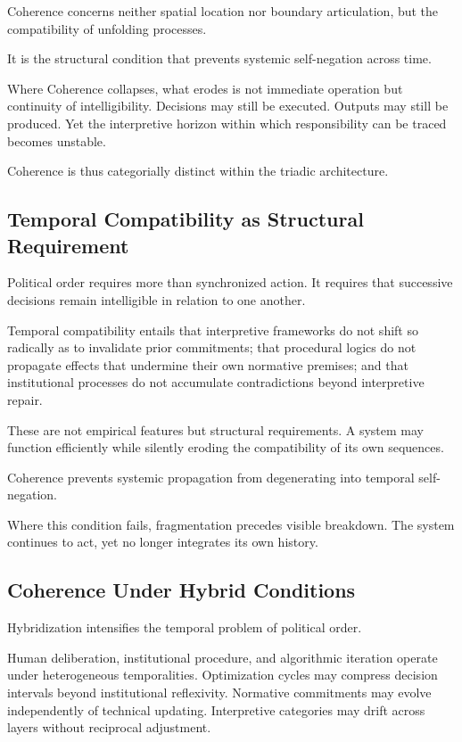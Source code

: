 \documentclass[12pt]{article}
\begin{document}
Coherence concerns neither spatial location nor boundary articulation, but the compatibility of unfolding processes.

It is the structural condition that prevents systemic self-negation across time.

Where Coherence collapses, what erodes is not immediate operation but continuity of intelligibility. Decisions may still be executed. Outputs may still be produced. Yet the interpretive horizon within which responsibility can be traced becomes unstable.

Coherence is thus categorially distinct within the triadic architecture.

\subsection{Temporal Compatibility as Structural Requirement}


Political order requires more than synchronized action. It requires that successive decisions remain intelligible in relation to one another.

Temporal compatibility entails that interpretive frameworks do not shift so radically as to invalidate prior commitments; that procedural logics do not propagate effects that undermine their own normative premises; and that institutional processes do not accumulate contradictions beyond interpretive repair.

These are not empirical features but structural requirements. A system may function efficiently while silently eroding the compatibility of its own sequences.

Coherence prevents systemic propagation from degenerating into temporal self-negation.

Where this condition fails, fragmentation precedes visible breakdown. The system continues to act, yet no longer integrates its own history.

\subsection{Coherence Under Hybrid Conditions}


Hybridization intensifies the temporal problem of political order.

Human deliberation, institutional procedure, and algorithmic iteration operate under heterogeneous temporalities. Optimization cycles may compress decision intervals beyond institutional reflexivity. Normative commitments may evolve independently of technical updating. Interpretive categories may drift across layers without reciprocal adjustment.
\end{document}
